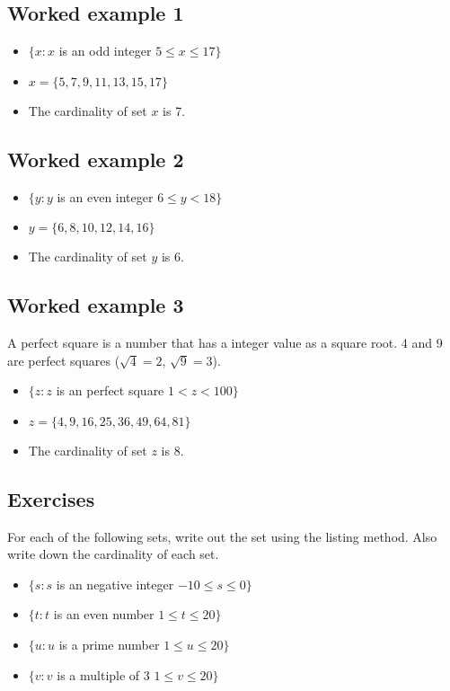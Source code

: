 \documentclass[a4paper,12pt]{article}
\begin{document}
\subsection*{Worked example 1}
\begin{itemize}
\item $\{ x : x $ is an odd integer $ 5 \leq x \leq 17 \}$
\item $x = \{5,7,9,11,13,15,17\}$
\item The cardinality of set $x$ is 7.
\end{itemize}

\subsection*{Worked example 2}
\begin{itemize}
\item $\{ y : y $ is an even integer $ 6 \leq y < 18 \}$
\item $y = \{6,8,10,12,14,16\}$
\item The cardinality of set $y$ is 6.
\end{itemize}

\subsection*{Worked example 3}
A perfect square is a number that has a integer value as a
square root. 4 and 9 are perfect squares ($\sqrt{4} = 2$,
$\sqrt{9} = 3$).
\begin{itemize}
\item $\{ z : z $ is an perfect square $ 1 < z < 100 \}$
\item $z = \{4,9,16,25,36,49,64,81\}$
\item The cardinality of set $z$ is 8.
\end{itemize}

\newpage

\subsection*{Exercises}
For each of the following sets, write out the set using the listing method.
Also write down the cardinality of each set.

\begin{itemize} 
\item $\{ s : s $ is an negative integer $ -10 \leq s \leq 0 \}$
\item $\{ t : t $ is an even number $ 1 \leq t \leq 20 \}$
\item $\{ u : u $ is a prime number $ 1 \leq u \leq 20 \}$
\item $\{ v : v $ is a multiple of 3 $ 1 \leq v \leq 20 \}$
\end{itemize}
\newpage
\end{document}
